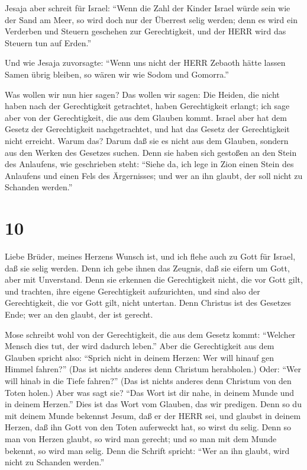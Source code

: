  Jesaja aber schreit für Israel: ``Wenn die Zahl der Kinder
Israel würde sein wie der Sand am Meer, so wird doch nur der Überrest
selig werden;  denn es wird ein Verderben und Steuern
geschehen zur Gerechtigkeit, und der HERR wird das Steuern tun auf
Erden.''

 Und wie Jesaja zuvorsagte: ``Wenn uns nicht der HERR
Zebaoth hätte lassen Samen übrig bleiben, so wären wir wie Sodom und
Gomorra.''

 Was wollen wir nun hier sagen? Das wollen wir sagen: Die
Heiden, die nicht haben nach der Gerechtigkeit getrachtet, haben
Gerechtigkeit erlangt; ich sage aber von der Gerechtigkeit, die aus dem
Glauben kommt.  Israel aber hat dem Gesetz der
Gerechtigkeit nachgetrachtet, und hat das Gesetz der Gerechtigkeit nicht
erreicht.  Warum das? Darum daß sie es nicht aus dem
Glauben, sondern aus den Werken des Gesetzes suchen. Denn sie haben sich
gestoßen an den Stein des Anlaufens,  wie geschrieben
steht: ``Siehe da, ich lege in Zion einen Stein des Anlaufens und einen
Fels des Ärgernisses; und wer an ihn glaubt, der soll nicht zu Schanden
werden.''

\hypertarget{section-9}{%
\section{10}\label{section-9}}

 Liebe Brüder, meines Herzens Wunsch ist, und ich flehe auch
zu Gott für Israel, daß sie selig werden.  Denn ich gebe
ihnen das Zeugnis, daß sie eifern um Gott, aber mit Unverstand.
 Denn sie erkennen die Gerechtigkeit nicht, die vor Gott
gilt, und trachten, ihre eigene Gerechtigkeit aufzurichten, und sind
also der Gerechtigkeit, die vor Gott gilt, nicht untertan. 
Denn Christus ist des Gesetzes Ende; wer an den glaubt, der ist gerecht.

 Mose schreibt wohl von der Gerechtigkeit, die aus dem
Gesetz kommt: ``Welcher Mensch dies tut, der wird dadurch leben.''
 Aber die Gerechtigkeit aus dem Glauben spricht also:
``Sprich nicht in deinem Herzen: Wer will hinauf gen Himmel fahren?''
(Das ist nichts anderes denn Christum herabholen.)  Oder:
``Wer will hinab in die Tiefe fahren?'' (Das ist nichts anderes denn
Christum von den Toten holen.)  Aber was sagt sie? ``Das
Wort ist dir nahe, in deinem Munde und in deinem Herzen.'' Dies ist das
Wort vom Glauben, das wir predigen.  Denn so du mit deinem
Munde bekennst Jesum, daß er der HERR sei, und glaubst in deinem Herzen,
daß ihn Gott von den Toten auferweckt hat, so wirst du selig.
 Denn so man von Herzen glaubt, so wird man gerecht; und so
man mit dem Munde bekennt, so wird man selig.  Denn die
Schrift spricht: ``Wer an ihn glaubt, wird nicht zu Schanden werden.''

